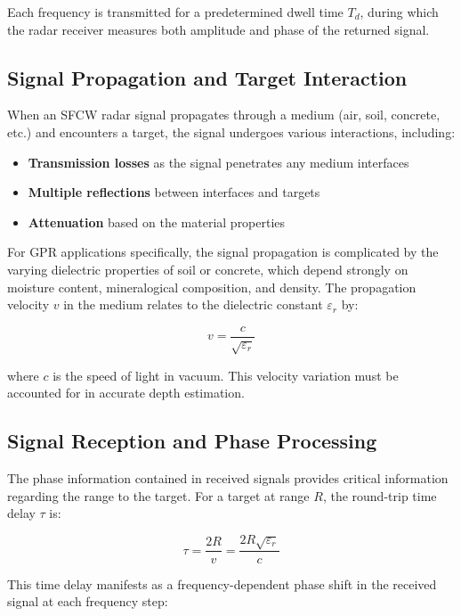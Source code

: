\documentclass[11pt,a4paper]{article}
\begin{document}
Each frequency is transmitted for a predetermined dwell time $T_d$, during which the radar receiver measures both amplitude and phase of the returned signal.

\subsection{Signal Propagation and Target Interaction}

When an SFCW radar signal propagates through a medium (air, soil, concrete, etc.) and encounters a target, the signal undergoes various interactions, including:
\begin{itemize}
    \item \textbf{Transmission losses} as the signal penetrates any medium interfaces
    \item \textbf{Multiple reflections} between interfaces and targets
    \item \textbf{Attenuation} based on the material properties
\end{itemize}

For GPR applications specifically, the signal propagation is complicated by the varying dielectric properties of soil or concrete, which depend strongly on moisture content, mineralogical composition, and density. The propagation velocity $v$ in the medium relates to the dielectric constant $\varepsilon_r$ by:

\begin{equation}
    v = \frac{c}{\sqrt{\varepsilon_r}}
\end{equation}

where $c$ is the speed of light in vacuum. This velocity variation must be accounted for in accurate depth estimation.

\subsection{Signal Reception and Phase Processing}

The phase information contained in received signals provides critical information regarding the range to the target. For a target at range $R$, the round-trip time delay $\tau$ is:

\begin{equation}
    \tau = \frac{2R}{v} = \frac{2R\sqrt{\varepsilon_r}}{c}
\end{equation}

This time delay manifests as a frequency-dependent phase shift in the received signal at each frequency step:
\end{document}
